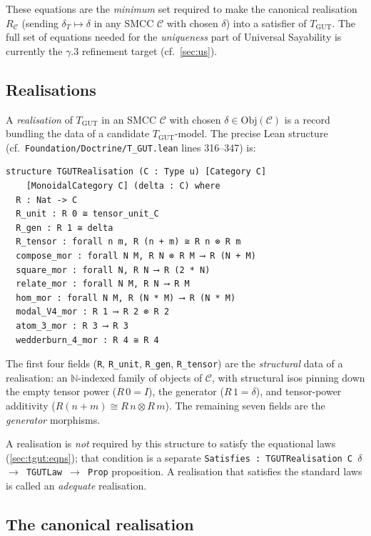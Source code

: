 \documentclass[11pt,a4paper]{article}
\theoremstyle{plain}
\theoremstyle{definition}
\theoremstyle{remark}
\newcommand{\N}{\mathbb{N}}
\newcommand{\Ob}{\mathrm{Obj}}
\newcommand{\TGUT}{T_{\mathrm{GUT}}}
\newcommand{\smcc}{SMCC}
\begin{document}
These equations are the \emph{minimum} set required to make the canonical realisation $R_{\mathcal{C}}$ (sending $\delta_T \mapsto \delta$ in any \smcc{} $\mathcal{C}$ with chosen $\delta$) into a satisfier of $\TGUT$. The full set of equations needed for the \emph{uniqueness} part of Universal Sayability is currently the $\gamma$.3 refinement target (cf.\ \cref{sec:us}).

\subsection{Realisations}\label{sec:tgut:real}

A \emph{realisation} of $\TGUT$ in an \smcc{} $\mathcal{C}$ with chosen $\delta \in \Ob(\mathcal{C})$ is a record bundling the data of a candidate $\TGUT$-model. The precise Lean structure (cf.\ \texttt{Foundation/Doctrine/T\_GUT.lean} lines 316--347) is:

\begin{lstlisting}[language=Lean]
structure TGUTRealisation (C : Type u) [Category C]
    [MonoidalCategory C] (delta : C) where
  R : Nat -> C
  R_unit : R 0 ≅ tensor_unit_C
  R_gen : R 1 ≅ delta
  R_tensor : forall n m, R (n + m) ≅ R n ⊗ R m
  compose_mor : forall N M, R N ⊗ R M ⟶ R (N + M)
  square_mor : forall N, R N ⟶ R (2 * N)
  relate_mor : forall N M, R N ⟶ R M
  hom_mor : forall N M, R (N * M) ⟶ R (N * M)
  modal_V4_mor : R 1 ⟶ R 2 ⊗ R 2
  atom_3_mor : R 3 ⟶ R 3
  wedderburn_4_mor : R 4 ≅ R 4
\end{lstlisting}

The first four fields (\texttt{R}, \texttt{R\_unit}, \texttt{R\_gen}, \texttt{R\_tensor}) are the \emph{structural} data of a realisation: an $\N$-indexed family of objects of $\mathcal{C}$, with structural isos pinning down the empty tensor power ($R\,0 = I$), the generator ($R\,1 = \delta$), and tensor-power additivity ($R(n+m) \cong R\,n \otimes R\,m$). The remaining seven fields are the \emph{generator} morphisms.

A realisation is \emph{not} required by this structure to satisfy the equational laws (\cref{sec:tgut:eqns}); that condition is a separate \texttt{Satisfies : TGUTRealisation C $\delta$ $\to$ TGUTLaw $\to$ Prop} proposition. A realisation that satisfies the standard laws is called an \emph{adequate} realisation.

\subsection{The canonical realisation}\label{sec:tgut:canon}
\end{document}

